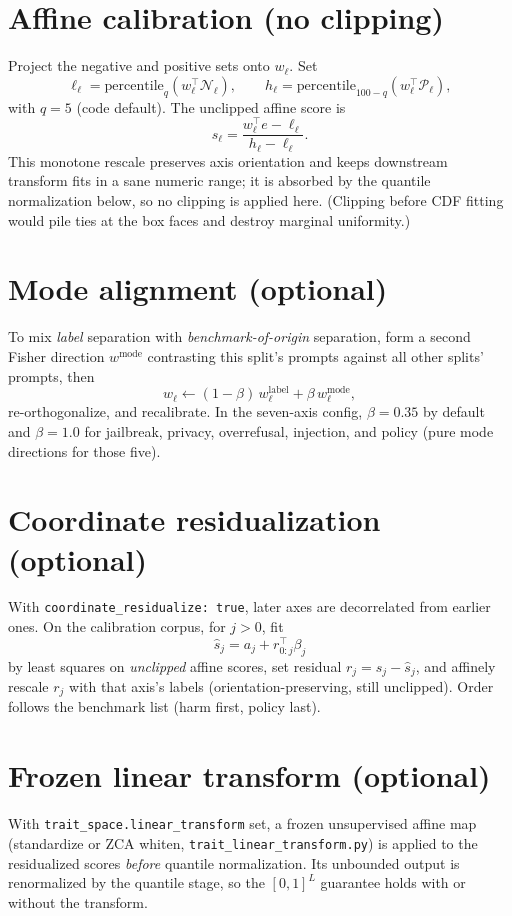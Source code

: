 \documentclass[11pt]{article}
\begin{document}
\section{Affine calibration (no clipping)}
Project the negative and positive sets onto \(w_\ell\). Set
\[
\ell_\ell=\mathrm{percentile}_{q}(w_\ell^\top\mathcal{N}_\ell),
\qquad
h_\ell=\mathrm{percentile}_{100-q}(w_\ell^\top\mathcal{P}_\ell),
\]
with \(q=5\) (code default). The unclipped affine score is
\[
s_\ell
=
\frac{w_\ell^\top e-\ell_\ell}{h_\ell-\ell_\ell}.
\]
This monotone rescale preserves axis orientation and keeps downstream
transform fits in a sane numeric range; it is absorbed by the quantile
normalization below, so no clipping is applied here. (Clipping before
CDF fitting would pile ties at the box faces and destroy marginal
uniformity.)

\section{Mode alignment (optional)}
To mix \emph{label} separation with \emph{benchmark-of-origin} separation, form a
second Fisher direction \(w^{\mathrm{mode}}\) contrasting this split's prompts
against all other splits' prompts, then
\[
w_\ell\leftarrow (1-\beta)\,w^{\mathrm{label}}_\ell+\beta\,w^{\mathrm{mode}}_\ell,
\]
re-orthogonalize, and recalibrate. In the seven-axis config,
\(\beta=0.35\) by default and \(\beta=1.0\) for jailbreak, privacy, overrefusal,
injection, and policy (pure mode directions for those five).

\section{Coordinate residualization (optional)}
With \texttt{coordinate\_residualize: true}, later axes are decorrelated from earlier
ones. On the calibration corpus, for \(j>0\), fit
\[
\hat s_j = a_j + r_{0:j}^\top\beta_j
\]
by least squares on \emph{unclipped} affine scores, set residual
\(r_j=s_j-\hat s_j\), and affinely rescale \(r_j\) with that axis's labels
(orientation-preserving, still unclipped). Order follows the benchmark
list (harm first, policy last).

\section{Frozen linear transform (optional)}
With \texttt{trait\_space.linear\_transform} set, a frozen unsupervised
affine map (standardize or ZCA whiten,
\texttt{trait\_linear\_transform.py}) is applied to the residualized
scores \emph{before} quantile normalization. Its unbounded output is
renormalized by the quantile stage, so the \([0,1]^L\) guarantee holds
with or without the transform.
\end{document}
